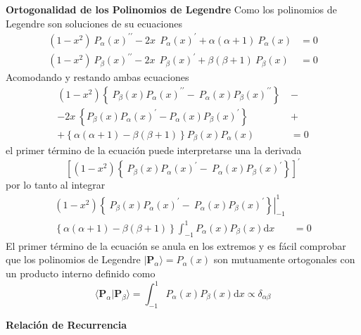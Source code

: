 \documentclass[spanish,notitlepage,letterpaper,12pt]{article}
\begin{document}
\textbf{Ortogonalidad de los Polinomios de Legendre}
\newline 
Como los polinomios de Legendre son soluciones de su ecuaciones
\begin{align*}
(1-x^{2})\ P_{\alpha}(x)^{\prime\prime}-2x\ \ P_{\alpha}(x)^{\prime}%
+\alpha(\alpha+1)\ P_{\alpha}(x)  & =0\\
(1-x^{2})\ P_{\beta}(x)^{\prime\prime}-2x\ \ P_{\beta}(x)^{\prime}+\beta
(\beta+1)\ P_{\beta}(x)  & =0
\end{align*}
Acomodando y restando ambas ecuaciones
\begin{align*}
(1-x^{2})\left\{  \ P_{\beta}(x)P_{\alpha}(x)^{\prime\prime}-\ P_{\alpha
}(x)P_{\beta}(x)^{\prime\prime}\right\}  \   & -\\
-2x\ \left\{  P_{\beta}(x)P_{\alpha}(x)^{\prime}-P_{\alpha}(x)P_{\beta
}(x)^{\prime}\right\}    & +\\
+\left\{  \alpha(\alpha+1)-\beta(\beta+1)\right\}  P_{\beta}(x)P_{\alpha}(x)
& =0
\end{align*}
el primer t\'{e}rmino de la ecuaci\'{o}n puede interpretarse una la derivada
\[
\left[  (1-x^{2})\left\{  \ P_{\beta}(x)P_{\alpha}(x)^{\prime}-\ P_{\alpha
}(x)P_{\beta}(x)^{\prime}\right\}  \right]  ^{\prime}%
\]
por lo tanto al integrar
\begin{align*}
\left.  (1-x^{2})\left\{  \ P_{\beta}(x)P_{\alpha}(x)^{\prime}-\ P_{\alpha
}(x)P_{\beta}(x)^{\prime}\right\}  \right|  _{-1}^{1}  & \\
\left\{  \alpha(\alpha+1)-\beta(\beta+1)\right\}  \int_{-1}^{1}P_{\alpha
}(x)P_{\beta}(x)\mathrm{d}x  & =0
\end{align*}
El primer t\'{e}rmino de la ecuaci\'{o}n se anula en los extremos y es
f\'{a}cil comprobar que los polinomios de Legendre $|\mathbf{P}_{\alpha
}\rangle=P_{\alpha}(x)$ son mutuamente ortogonales con un producto interno
definido como
\[
\langle\mathbf{P}_{\alpha}|\mathbf{P}_{\beta}\rangle=\int_{-1}^{1}P_{\alpha
}(x)P_{\beta}(x)\mathrm{d}x\propto\delta_{\alpha\beta}%
\]

\textbf{Relaci\'{o}n de Recurrencia}
\end{document}
